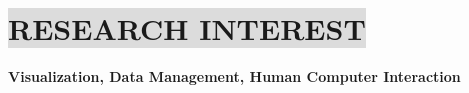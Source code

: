 \section*{
    \colorbox{gainsboro}{RESEARCH INTEREST}
}
\textbf{Visualization, Data Management, Human Computer Interaction}
